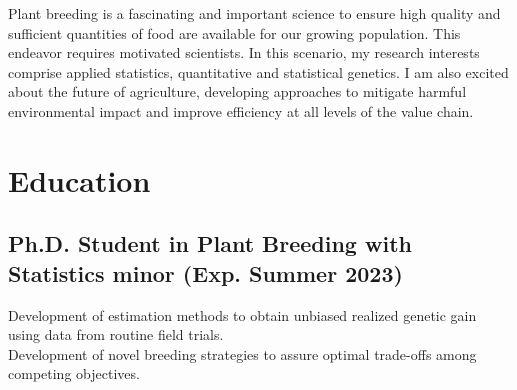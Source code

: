 \documentclass[]{deedy-resume-openfont}
\begin{document}
%
%

%
%

%
%

\begin{minipage}[t]{1\textwidth} 

\sectionsep

Plant breeding is a fascinating and important science to ensure high quality and sufficient quantities of food are available for our growing population. This endeavor requires motivated scientists. In this scenario, my research interests comprise applied statistics, quantitative and statistical genetics. I am also excited about the future of agriculture, developing approaches to mitigate harmful environmental impact and improve efficiency at all levels of the value chain.

\sectionsep


\section{Education} 

\sectionsep

\subsection{Ph.D. Student in Plant Breeding with Statistics minor (Exp. Summer 2023)}
 Development of
estimation methods to obtain unbiased realized genetic gain using data from routine field trials. \\ 
\hspace{1.55 cm} Development of novel breeding strategies to assure optimal trade-offs among
competing objectives.

\sectionsep
\vspace{0.2 mm}


\end{minipage}
\end{document}
